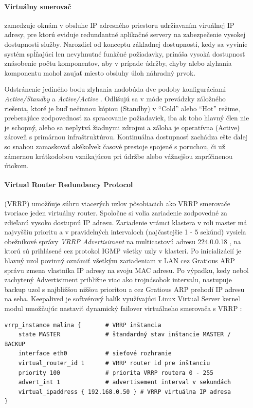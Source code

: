 \documentclass[12pt, a4paper]{article}
\begin{document}
\paragraph{Virtuálny smerovač} zamedzuje oknám v obsluhe IP adresného priestoru udržiavaním viruálnej 
IP adresy, pre ktorú eviduje redundantné aplikačné servery na zabezpečenie vysokej dostupnosti služby. 
Narozdiel od konceptu základnej dostupnosti, kedy sa vyvinie systém spĺňajúci len nevyhnutné funkčné 
požiadavky, prináša vysoká dostupnosť znásobenie počtu komponentov, aby v prípade údržby, chyby alebo 
zlyhania komponentu mohol zaujať miesto obsluhy úloh náhradný prvok. 

Odstránenie jediného bodu zlyhania nadobúda dve podoby konfiguráciami \emph{Active/Standby} a
\emph{Active/Active} \cite{availability}. Odlišujú sa v móde prevádzky záložného riešenia, 
ktoré je buď nečinnou kópiou (Standby) v \enquote{Cold} alebo \enquote{Hot} režime, preberajúce 
zodpovednosť za spracovanie požiadaviek, iba ak toho hlavný člen nie je schopný, alebo 
sa neplytvá žiadnymi zdrojmi a záloha je operatívna (Active) zároveň s primárnou infraštruktúrou. 
Kontinuálna dostupnosť zachádza ešte ďalej so snahou zamaskovať akékoľvek časové prestoje spojené s 
poruchou, či už zámernou krátkodobou vznikajúcou pri údržbe alebo vážnejšou zapríčinenou útokom.

\paragraph{Virtual Router Redundancy Protocol} (VRRP) umožňuje súhru viacerých uzlov pôsobiacich ako VRRP 
smerovače tvoriace jeden virtuálny router. Spoločne si volia zariadenie zodpovedné za zdieľanú vysoko 
dostupnú IP adresu. Zariadenie vrámci klastera v roli master má najvyššiu prioritu a v pravidelných 
intervaloch (najčastejšie 1 - 5 sekúnd) vysiela obežníkové správy \emph{VRRP Advertisiment} na multicastovú 
adresu 224.0.0.18 \cite{RFC2338}, na ktorú sú prihlásené cez protokol IGMP všetky uzly v klasteri. Po 
inicializácií je hlavný uzol povinný oznámiť všetkým zariadeniam v LAN cez Gratious ARP správu zmena 
vlastníka IP adresy na svoju MAC adresu. Po výpadku, kedy nebol zachytený Advertisiment približne viac ako 
trojnásobok intervalu, nastupuje backup uzol s najbližšou nižšou prioritou a cez Gratious ARP prehodí IP 
adresu na seba. Keepalived je softvérový balík využívajúci Linux Virtual Server kernel modul umožňujúc 
nastaviť dynamický failover virtuálneho smerovača s VRRP \cite{keepalived-docs}:
\begin{lstlisting}
vrrp_instance malina {       # VRRP inštancia
    state MASTER             # štandardný stav inštancie MASTER / BACKUP
    interface eth0           # sieťové rozhranie
    virtual_router_id 1      # VRRP router id pre inštanciu
    priority 100             # priorita VRRP routera 0 - 255
    advert_int 1             # advertisement interval v sekundách
    virtual_ipaddress { 192.168.0.50 } # VRRP virtuálna IP adresa
}
\end{lstlisting}
\end{document}
